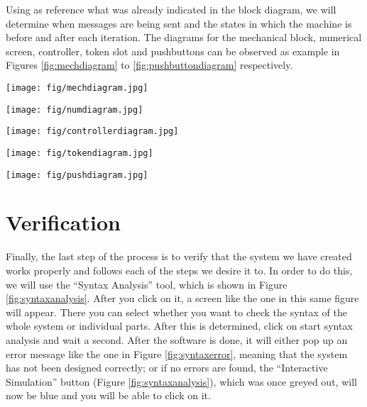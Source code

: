 \documentclass[12pt]{article}
\begin{document}
Using as reference what was already indicated in the block diagram, we will determine when messages are being sent and the states in which the machine is before and after each iteration. The diagrams for the mechanical block, numerical screen, controller, token slot and pushbuttons can be observed as example in Figures \ref{fig:mechdiagram} to \ref{fig:pushbuttondiagram} respectively.
\begin{figure*}[htbp]
\centering
\texttt{[image: fig/mechdiagram.jpg]}
\caption{Mechanical block diagram} \label{fig:mechdiagram}
\end{figure*}

\begin{figure*}[htbp]
\centering
\texttt{[image: fig/numdiagram.jpg]}
\caption{Numerical screen diagram} \label{fig:numdiagram}
\end{figure*}

\begin{figure*}[htbp]
\centering
\texttt{[image: fig/controllerdiagram.jpg]}
\caption{Controller diagram} \label{fig:controllerdiagram}
\end{figure*}

\begin{figure*}[htbp]
\centering
\texttt{[image: fig/tokendiagram.jpg]}
\caption{Token slot diagram} \label{fig:tokendiagram}
\end{figure*}

\begin{figure*}[htbp]
\centering
\texttt{[image: fig/pushdiagram.jpg]}
\caption{Pushbuttons diagram} \label{fig:pushbuttondiagram}
\end{figure*}

\section{Verification}
	Finally, the last step of the process is to verify that the system we have created works properly and follows each of the steps we desire it to. In order to do this, we will use the “Syntax Analysis” tool, which is shown in Figure \ref{fig:syntaxanalysis}. After you click on it, a screen like the one in this same figure will appear. There you can select whether you want to check the syntax of the whole system or individual parts. After this is determined, click on start syntax analysis and wait a second. After the software is done, it will either pop up an error message like the one in Figure \ref{fig:syntaxerror}, meaning that the system has not been designed correctly; or if no errors are found, the “Interactive Simulation” button (Figure \ref{fig:syntaxanalysis}), which was once greyed out, will now be blue and you will be able to click on it.
\end{document}
